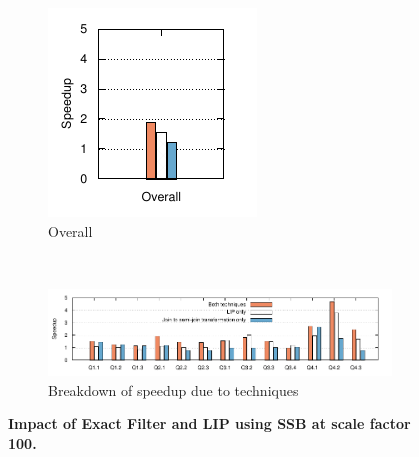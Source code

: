 \begin{figure}[bht]
	\centering 
	\begin{subfigure}[ht]{0.2\textwidth}
		\includegraphics[width=\textwidth]{system/figures/lip-ef-impact-total}
		\caption{Overall}
	\end{subfigure}
	~
	\begin{subfigure}[ht]{0.7\textwidth}
		\includegraphics[width=\textwidth]{system/figures/lip-ef-impact}
		\caption{Breakdown of speedup due to techniques}
	\end{subfigure}
	\caption{\textbf{Impact of Exact Filter and LIP using SSB at scale factor 100.}}
	\label{fig-lip-ef-impact}
\end{figure}


